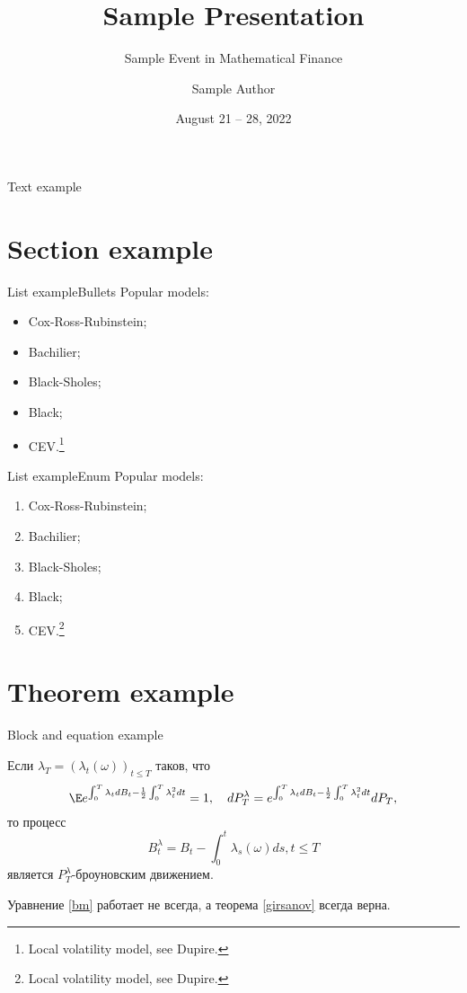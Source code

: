\documentclass[aspectratio=169]{beamer}
\title{Sample Presentation}
\subtitle{Sample Event in Mathematical Finance}
\author{Sample Author}
\institute{Vega Institute Foundation}
\date{August 21 -- 28, 2022}
\begin{document}
    \maketitle

    \begin{frame}{Text example}
        \lipsum[1]
    \end{frame}

    \section{Section example}
    \begin{frame}{List example}{Bullets}
        Popular models:
        \begin{itemize}
            \item Cox-Ross-Rubinstein;
            \item Bachilier;
            \item Black-Sholes;
            \item Black;
            \item CEV.\footnote{Local volatility model, see Dupire.}
        \end{itemize}
    \end{frame}

    \begin{frame}{List example}{Enum} 
        Popular models:
        \begin{enumerate}
            \item Cox-Ross-Rubinstein;
            \item Bachilier;
            \item Black-Sholes;
            \item Black;
            \item CEV.\footnote{Local volatility model, see Dupire.}
        \end{enumerate}
    \end{frame}

    \section{Theorem example}
    \begin{frame}{Block  and equation example}
        \begin{theorem}[И. Гирсанов]\label{girsanov}
			Если $\lambda_T = (\lambda_t (\omega))_{t \leq T}$ таков, что 
			\begin{equation}
             \E e^{\int_0^T \lambda_t dB_t - \frac{1}{2}\int_0^T \lambda_t^2 dt} = 1, \quad dP_T^\lambda = e^{\int_0^T \lambda_t dB_t - \frac{1}{2}\int_0^T \lambda_t^2 dt} dP_T,
			\end{equation}
			то процесс 
			\begin{equation}\label{bm}
				B^\lambda_t = B_t - \int_0^t \lambda_s(\omega) ds, t \leq T
			\end{equation}
			 является $P_T^\lambda$-броуновским движением.
		\end{theorem}
        Уравнение \eqref{bm} работает не всегда, а теорема \ref{girsanov} всегда верна.
    \end{frame}
\end{document}
